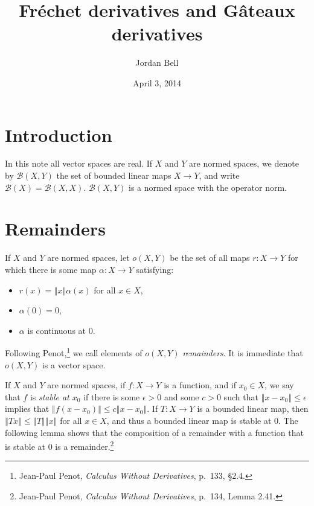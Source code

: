 \documentclass{article}
\newcommand{\norm}[1]{\left\Vert #1 \right\Vert}
\theoremstyle{definition}
\begin{document}
\title{Fr\'echet derivatives and G\^ateaux derivatives}
\author{Jordan Bell}
\date{April 3, 2014}

\maketitle

\section{Introduction}
In this note all vector spaces are real.
 If $X$ and $Y$ are normed spaces,
we denote by $\mathscr{B}(X,Y)$ the set of bounded linear maps $X \to Y$, and write $\mathscr{B}(X)=\mathscr{B}(X,X)$.
$\mathscr{B}(X,Y)$ is a normed space with the operator norm.


\section{Remainders}
If $X$ and $Y$ are normed spaces, let $o(X,Y)$ be the set of all maps $r:X \to Y$ 
for which there is some map $\alpha:X \to Y$ satisfying:
\begin{itemize}
\item $r(x)=\norm{x}\alpha(x)$ for all $x \in X$,
\item $\alpha(0)=0$,
\item $\alpha$ is continuous at $0$.
\end{itemize}
Following
Penot,\footnote{Jean-Paul Penot, {\em Calculus Without Derivatives}, p.~133, \S 2.4.} we call elements of $o(X,Y)$ {\em remainders}.
It is immediate that $o(X,Y)$ is a vector space.

If $X$ and $Y$ are normed spaces, if $f:X \to Y$ is a function, and if $x_0 \in X$, we say that $f$ is {\em stable at $x_0$} if there is some
$\epsilon>0$ and some $c>0$ such that $\norm{x-x_0} \leq \epsilon$ implies that $\norm{f(x-x_0)} \leq c \norm{x-x_0}$.
If $T:X \to Y$ is a bounded linear map, then $\norm{Tx} \leq \norm{T} \norm{x}$ for all $x \in X$, and thus a bounded linear map
is stable at $0$. The following lemma shows that the composition of  a remainder with a function that is stable at $0$ is a remainder.\footnote{Jean-Paul
Penot, {\em Calculus Without Derivatives}, p.~134, Lemma 2.41.}
\end{document}
